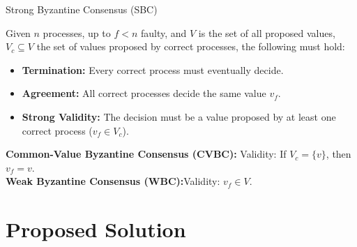 \documentclass{beamer}
\begin{document}
\begin{frame}{Strong Byzantine Consensus (SBC)}
\begin{definition}[\sbc] 
	Given $n$ processes, up to $f<n$ faulty, and $V$ is the set of all proposed values, $V_c \subseteq V$ the set of values proposed by correct processes, the following must hold:
	\begin{itemize}
		\item \textbf{Termination: } Every correct process must eventually decide.
		\item \textbf{Agreement: } All correct processes decide the same value $v_f$.
		\item \textbf{Strong Validity: } The decision must be a value proposed by at least one correct process (\ie $v_f \in V_c$).
	\end{itemize}
\end{definition}
{
\small
\textbf{Common-Value Byzantine Consensus (CVBC):} Validity:  If $V_c=\{v\}$, then $v_f = v$.\\


\textbf{Weak Byzantine Consensus (WBC):}Validity: $v_f \in V$.
}
\end{frame}




\section{Proposed Solution}
\end{document}
